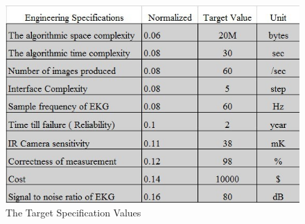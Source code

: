 \documentclass[paper=letter, fontsize=11pt]{scrartcl}
\numberwithin{equation}{section}		%
\numberwithin{figure}{section}			%
\numberwithin{table}{section}			%
\begin{document}
\begin{figure}[H]
	\centering
	\includegraphics[scale=1]{target.jpg}
	\caption{The Target Specification Values}
\end{figure}
\end{document}
